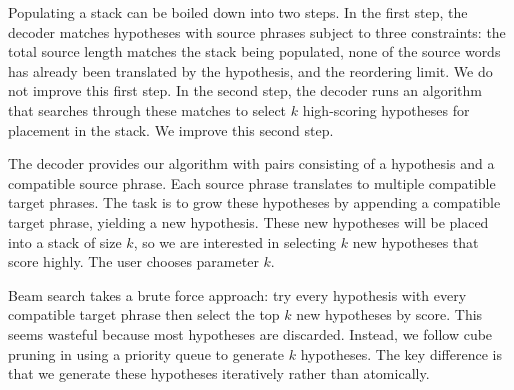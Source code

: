 \documentclass[11pt]{article}
\begin{document}
Populating a stack can be boiled down into two steps.  In the first step, the decoder matches hypotheses with source phrases subject to three constraints: the total source length matches the stack being populated, none of the source words has already been translated by the hypothesis, and the reordering limit.  We do not improve this first step.  In the second step, the decoder runs an algorithm that searches through these matches to select $k$ high-scoring hypotheses for placement in the stack.  We improve this second step.   


The decoder provides our algorithm with pairs consisting of a hypothesis and a compatible source phrase.  Each source phrase translates to multiple compatible target phrases.  The task is to grow these hypotheses by appending a compatible target phrase, yielding a new hypothesis.  These new hypotheses will be placed into a stack of size $k$, so we are interested in selecting $k$ new hypotheses that score highly.  The user chooses parameter $k$.

Beam search \cite{beam-speech,pharaoh} takes a brute force approach: try every hypothesis with every compatible target phrase then select the top $k$ new hypotheses by score.  This seems wasteful because most hypotheses are discarded.  Instead, we follow cube pruning \cite{cubepruning} in using a priority queue to generate $k$ hypotheses.  The key difference is that we generate these hypotheses iteratively rather than atomically.  

\end{document}
